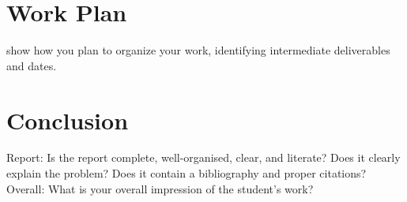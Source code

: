 \documentclass{mprop}
\begin{document}
\section{Work Plan}

show how you plan to organize your work, identifying intermediate deliverables and dates.

\section{Conclusion}

Report: Is the report complete, well-organised, clear, and literate? Does it clearly explain the problem? Does it contain a bibliography and proper citations?
Overall: What is your overall impression of the student’s work?



\end{document}
